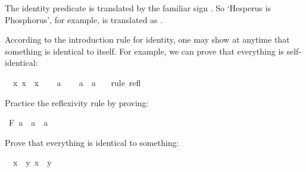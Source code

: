 \begin{isabellebody}
\begin{isamarkuptext}
The identity predicate is translated by the familiar sign \isa{{\isacharequal}}. So `Hesperus is Phosphorus',
for example, is translated as .%
\end{isamarkuptext}\isamarkuptrue%
%
\isamarkuptrue%
%
\begin{isamarkuptext}%
According to the introduction rule for identity, one may show at anytime that something is
identical to itself. For example, we can prove that everything is self-identical:%
\end{isamarkuptext}\isamarkuptrue%
\isamarkupfalse%
\ {\isachardoublequoteopen}{\isasymforall}\ x{\isachardot}\ x\ {\isacharequal}\ x{\isachardoublequoteclose}\isanewline
%
\isadelimproof
%
\endisadelimproof
%
\isatagproof
{}\isamarkupfalse%
\isanewline
\ \ \isamarkupfalse%
\ a\isanewline
\ \ \isamarkupfalse%
\ {\isachardoublequoteopen}a\ {\isacharequal}\ a\ {\isachardoublequoteclose}\ \isamarkupfalse%
\ {\isacharparenleft}rule\ refl{\isacharparenright}\isanewline
{}\isamarkupfalse%
%
\endisatagproof
{\isafoldproof}%
%
\isadelimproof
%
\endisadelimproof
%
\begin{isamarkuptext}%
\begin{Exercise} Practice the reflexivity rule by proving: \end{Exercise}%
\end{isamarkuptext}\isamarkuptrue%
\isamarkupfalse%
\ {\isachardoublequoteopen}F\ a\ {\isasymlongrightarrow}\ a\ {\isacharequal}\ a{\isachardoublequoteclose}%
\isadelimproof
\ %
\endisadelimproof
%
\isatagproof
{}\isamarkupfalse%
%
\endisatagproof
{\isafoldproof}%
%
\isadelimproof
%
\endisadelimproof
%
\begin{isamarkuptext}%
\begin{Exercise}[label = everythingissomething] Prove that everything is identical to something: \end{Exercise}%
\end{isamarkuptext}\isamarkuptrue%
\isamarkupfalse%
\ {\isachardoublequoteopen}{\isasymforall}\ x{\isachardot}\ {\isasymexists}\ y{\isachardot}\ x\ {\isacharequal}\ y{\isachardoublequoteclose}%
\isadelimproof
\ %
\endisadelimproof
%
\isatagproof
{}\isamarkupfalse%
%
\endisatagproof
{\isafoldproof}%
%
\isadelimproof
%
\endisadelimproof
%
\isamarkuptrue%
%
\begin{isamarkuptext}%

\end{isamarkuptext}
\end{isabellebody}
